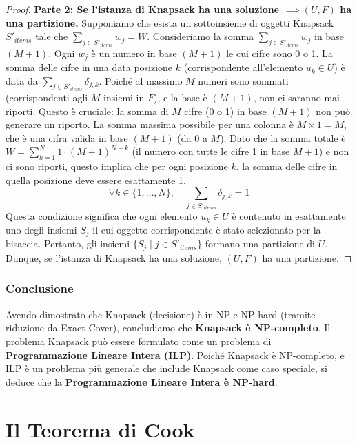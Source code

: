 \documentclass[a4paper, 11pt]{book} %
\theoremstyle{definition}
\begin{document}
\begin{proof}
\textbf{Parte 2: Se l'istanza di Knapsack ha una soluzione $\implies (U, F)$ ha una partizione.}
Supponiamo che esista un sottoinsieme di oggetti Knapsack $S'_{items}$ tale che $\sum_{j \in S'_{items}} w_j = W$.
Consideriamo la somma $\sum_{j \in S'_{items}} w_j$ in base $(M+1)$. Ogni $w_j$ è un numero in base $(M+1)$ le cui cifre sono 0 o 1.
La somma delle cifre in una data posizione $k$ (corrispondente all'elemento $u_k \in U$) è data da $\sum_{j \in S'_{items}} \delta_{j,k}$. Poiché al massimo $M$ numeri sono sommati (corrispondenti agli $M$ insiemi in $F$), e la base è $(M+1)$, non ci saranno mai riporti. Questo è cruciale: la somma di $M$ cifre (0 o 1) in base $(M+1)$ non può generare un riporto. La somma massima possibile per una colonna è $M \times 1 = M$, che è una cifra valida in base $(M+1)$ (da 0 a $M$).
Dato che la somma totale è $W = \sum_{k=1}^N 1 \cdot (M+1)^{N-k}$ (il numero con tutte le cifre 1 in base $M+1$) e non ci sono riporti, questo implica che per ogni posizione $k$, la somma delle cifre in quella posizione deve essere esattamente 1.
\[ \forall k \in \{1, \ldots, N\}, \quad \sum_{j \in S'_{items}} \delta_{j,k} = 1 \]
Questa condizione significa che ogni elemento $u_k \in U$ è contenuto in esattamente uno degli insiemi $S_j$ il cui oggetto corrispondente è stato selezionato per la bisaccia.
Pertanto, gli insiemi $\{S_j \mid j \in S'_{items}\}$ formano una partizione di $U$.
Dunque, se l'istanza di Knapsack ha una soluzione, $(U, F)$ ha una partizione.
\end{proof}

\subsection{Conclusione}
Avendo dimostrato che Knapsack (decisione) è in NP e NP-hard (tramite riduzione da Exact Cover), concludiamo che \textbf{Knapsack è NP-completo}.
Il problema Knapsack può essere formulato come un problema di \textbf{Programmazione Lineare Intera (ILP)}. Poiché Knapsack è NP-completo, e ILP è un problema più generale che include Knapsack come caso speciale, si deduce che la \textbf{Programmazione Lineare Intera è NP-hard}.



\chapter{Il Teorema di Cook}
\end{document}
